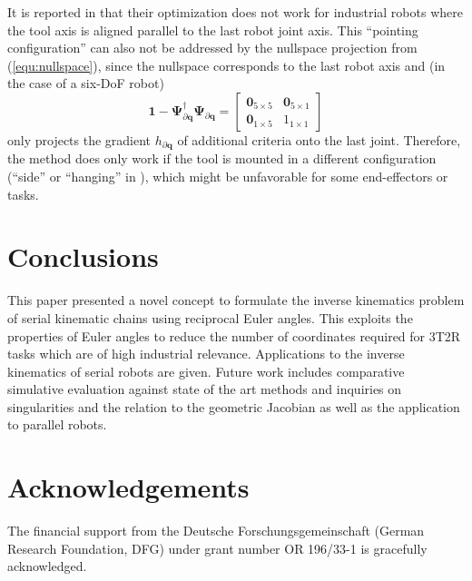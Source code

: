 \documentclass{svproc}
\newcommand{\bm}[1]{\boldsymbol{#1}}
\begin{document}
It is reported in \cite{GuoDonKe2015} that their optimization does not work for industrial robots where the tool axis is aligned parallel to the last robot joint axis.
This ``pointing configuration'' can also not be addressed by the nullspace projection from (\ref{equ:nullspace}), since the nullspace corresponds to the last robot axis and (in the case of a six-DoF robot)
%
\begin{equation}
\bm{1}-\bm{\Psi}_{\partial\bm{q}}^{\dagger}\bm{\Psi}_{\partial\bm{q}}
=
\begin{bmatrix}
\bm{0}_{5 \times 5} & \bm{0}_{5 \times 1} \\
\bm{0}_{1 \times 5} & 1_{1 \times 1}
\end{bmatrix}
\end{equation}
%
only projects the gradient $h_{\partial\bm{q}}$ of additional criteria onto the last joint.
Therefore, the method does only work if the tool is mounted in a different configuration (``side'' or ``hanging'' in \cite{GuoDonKe2015}), which might be unfavorable for some end-effectors or tasks.

\section{Conclusions}
\label{sec:Conclusion}

This paper presented a novel concept to formulate the inverse kinematics problem of serial kinematic chains using reciprocal Euler angles.
This exploits the properties of Euler angles to reduce the number of coordinates required for 3T2R tasks which are of high industrial relevance.
Applications to the inverse kinematics of serial robots are given.
%
Future work includes comparative simulative evaluation against state of the art methods and inquiries on singularities and the relation to the geometric Jacobian as well as the application to parallel robots.


\section*{Acknowledgements}

The financial support from the Deutsche Forschungsgemeinschaft (German Research Foundation, DFG) under grant number OR 196/33-1 is gracefully acknowledged.



\end{document}

